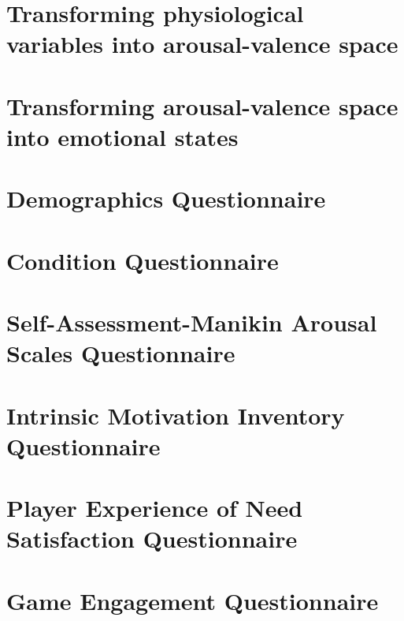 \documentclass{uofsthesis-cs}
\begin{document}




\uofsappendix
\chapter{Transforming physiological variables into arousal-valence space} \label{app:phys-to-av}    
\chapter{Transforming arousal-valence space into emotional states}        \label{app:av-to-emotion} 
\chapter{Demographics Questionnaire}                                      \label{app:q-dmg}         
\chapter{Condition Questionnaire}                                         \label{app:q-cnd}         
\chapter{Self-Assessment-Manikin Arousal Scales Questionnaire}            \label{app:q-sam}         
\chapter{Intrinsic Motivation Inventory Questionnaire}                    \label{app:q-ini}         
\chapter{Player Experience of Need Satisfaction Questionnaire}            \label{app:q-pens}        
\chapter{Game Engagement Questionnaire}                                   \label{app:q-geq}         

\end{document}
